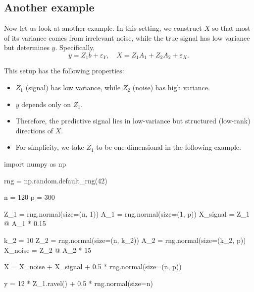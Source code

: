 \documentclass[
  letterpaper,
  DIV=11,
  numbers=noendperiod]{scrreprt}
\newenvironment{Shaded}{\begin{snugshade}}{\end{snugshade}}
\newcommand{\DecValTok}[1]{\textcolor[rgb]{0.68,0.00,0.00}{#1}}
\newcommand{\FloatTok}[1]{\textcolor[rgb]{0.68,0.00,0.00}{#1}}
\newcommand{\ImportTok}[1]{\textcolor[rgb]{0.00,0.46,0.62}{#1}}
\newcommand{\NormalTok}[1]{\textcolor[rgb]{0.00,0.23,0.31}{#1}}
\newcommand{\OperatorTok}[1]{\textcolor[rgb]{0.37,0.37,0.37}{#1}}
\providecommand{\tightlist}{%
  \setlength{\itemsep}{0pt}\setlength{\parskip}{0pt}}
\theoremstyle{definition}
\theoremstyle{definition}
\theoremstyle{plain}
\theoremstyle{plain}
\theoremstyle{remark}
\begin{document}
\subsection{Another example}\label{another-example}

Now let us look at another example. In this setting, we construct \(X\)
so that most of its variance comes from irrelevant noise, while the true
signal has low variance but determines \(y\). Specifically, \[
y = Z_1 b + \varepsilon_Y, \quad
X = Z_1 A_1 + Z_2 A_2 + \varepsilon_X.
\]

This setup has the following properties:

\begin{itemize}
\tightlist
\item
  \(Z_1\) (signal) has low variance, while \(Z_2\) (noise) has high
  variance.
\item
  \(y\) depends only on \(Z_1\).
\item
  Therefore, the predictive signal lies in low-variance but structured
  (low-rank) directions of \(X\).
\item
  For simplicity, we take \(Z_1\) to be one-dimensional in the following
  example.
\end{itemize}

\begin{Shaded}
\begin{Highlighting}[]
\ImportTok{import}\NormalTok{ numpy }\ImportTok{as}\NormalTok{ np}

\NormalTok{rng }\OperatorTok{=}\NormalTok{ np.random.default\_rng(}\DecValTok{42}\NormalTok{)}

\NormalTok{n }\OperatorTok{=} \DecValTok{120}
\NormalTok{p }\OperatorTok{=} \DecValTok{300}

\NormalTok{Z\_1 }\OperatorTok{=}\NormalTok{ rng.normal(size}\OperatorTok{=}\NormalTok{(n, }\DecValTok{1}\NormalTok{))}
\NormalTok{A\_1 }\OperatorTok{=}\NormalTok{ rng.normal(size}\OperatorTok{=}\NormalTok{(}\DecValTok{1}\NormalTok{, p))}
\NormalTok{X\_signal }\OperatorTok{=}\NormalTok{ Z\_1 }\OperatorTok{@}\NormalTok{ A\_1 }\OperatorTok{*} \FloatTok{0.15}

\NormalTok{k\_2 }\OperatorTok{=} \DecValTok{10}
\NormalTok{Z\_2 }\OperatorTok{=}\NormalTok{ rng.normal(size}\OperatorTok{=}\NormalTok{(n, k\_2))}
\NormalTok{A\_2 }\OperatorTok{=}\NormalTok{ rng.normal(size}\OperatorTok{=}\NormalTok{(k\_2, p))}
\NormalTok{X\_noise }\OperatorTok{=}\NormalTok{ Z\_2 }\OperatorTok{@}\NormalTok{ A\_2 }\OperatorTok{*} \DecValTok{15}

\NormalTok{X }\OperatorTok{=}\NormalTok{ X\_noise }\OperatorTok{+}\NormalTok{ X\_signal }\OperatorTok{+} \FloatTok{0.5} \OperatorTok{*}\NormalTok{ rng.normal(size}\OperatorTok{=}\NormalTok{(n, p))}

\NormalTok{y }\OperatorTok{=} \DecValTok{12} \OperatorTok{*}\NormalTok{ Z\_1.ravel() }\OperatorTok{+} \FloatTok{0.5} \OperatorTok{*}\NormalTok{ rng.normal(size}\OperatorTok{=}\NormalTok{n)}
\end{Highlighting}
\end{Shaded}
\end{document}
